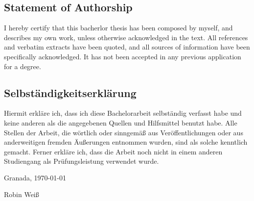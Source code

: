\thispagestyle{empty}

\vspace{5cm}

\subsection*{Statement of Authorship}
I hereby certify that this bacherlor thesis has been composed by myself, and describes my own work, unless otherwise acknowledged in the text. All references and verbatim extracts have been quoted, and all sources of information have been specifically acknowledged. It has not been accepted in any previous application for a degree.

\subsection*{Selbständigkeitserklärung}
Hiermit erkläre ich, dass ich diese Bachelorarbeit selbständig verfasst habe und keine anderen als die angegebenen Quellen und Hilfsmittel benutzt habe. Alle Stellen der Arbeit, die wörtlich oder sinngemäß aus Veröffentlichungen oder aus anderweitigen fremden Äußerungen entnommen wurden, sind als solche kenntlich gemacht. Ferner erkläre ich, dass die Arbeit noch nicht in einem anderen Studiengang als Prüfungsleistung verwendet wurde.

\vspace{1cm}

\noindent 
Granada, \today
  
\vspace{2cm}

\noindent
Robin Weiß



